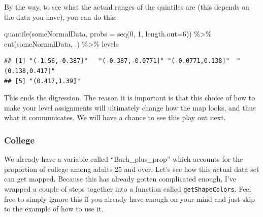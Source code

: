 \documentclass[
  openany]{book}
\newenvironment{Shaded}{\begin{snugshade}}{\end{snugshade}}
\newcommand{\AttributeTok}[1]{\textcolor[rgb]{0.77,0.63,0.00}{#1}}
\newcommand{\DecValTok}[1]{\textcolor[rgb]{0.00,0.00,0.81}{#1}}
\newcommand{\FunctionTok}[1]{\textcolor[rgb]{0.00,0.00,0.00}{#1}}
\newcommand{\NormalTok}[1]{#1}
\newcommand{\SpecialCharTok}[1]{\textcolor[rgb]{0.00,0.00,0.00}{#1}}
\begin{document}
By the way, to see what the actual ranges of the quintiles are (this depends on the data you have), you can do this:

\begin{Shaded}
\begin{Highlighting}[]
\FunctionTok{quantile}\NormalTok{(someNormalData, }\AttributeTok{probs =} \FunctionTok{seq}\NormalTok{(}\DecValTok{0}\NormalTok{, }\DecValTok{1}\NormalTok{, }\AttributeTok{length.out=}\DecValTok{6}\NormalTok{)) }\SpecialCharTok{\%\textgreater{}\%}
  \FunctionTok{cut}\NormalTok{(someNormalData, .) }\SpecialCharTok{\%\textgreater{}\%}\NormalTok{ levels}
\end{Highlighting}
\end{Shaded}

\begin{verbatim}
## [1] "(-1.56,-0.387]"   "(-0.387,-0.0771]" "(-0.0771,0.138]"  "(0.138,0.417]"
## [5] "(0.417,1.39]"
\end{verbatim}

This ends the digression. The reason it is important is that this choice of how to make your level assignments will ultimately change how the map looks, and thus what it communicates. We will have a chance to see this play out next.

\hypertarget{college}{%
\subsubsection*{College}\label{college}}

We already have a variable called ``Bach\_plus\_prop'' which accounts for the proportion of college among adults 25 and over. Let's see how this actual data set can get mapped. Because this has already gotten complicated enough, I've wrapped a couple of steps together into a function called \texttt{getShapeColors}. Feel free to simply ignore this if you already have enough on your mind and just skip to the example of how to use it.
\end{document}
